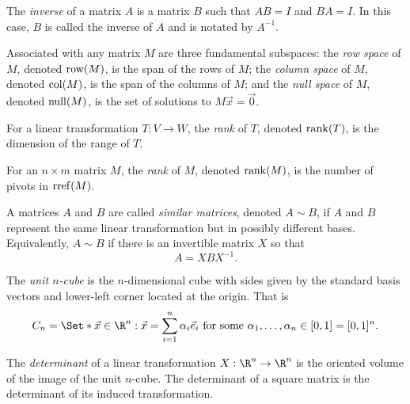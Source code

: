 \begin{SaveDefinition}[
	key=MatrixInverse,
	title={Matrix Inverse}]
		
	The \emph{inverse} of a matrix $A$ is a
		matrix $B$ such that $AB=I$ and $BA=I$.
		In this case, $B$ is called the inverse of $A$ and is notated by $A^{-1}$.
\end{SaveDefinition}

\begin{SaveDefinition}[key=FundamentalSubspaces, title={Fundamental Subspaces}]
	Associated with any matrix $M$ are three fundamental subspaces: the
	\emph{row space} of $M$, denoted $\operatorname{row}(M)$, is the span of the rows of
	$M$; the
	\emph{column space} of $M$, denoted $\operatorname{col}(M)$, is the span of the
	columns of $M$; and the
	\emph{null space} of $M$, denoted $\operatorname{null}(M)$, is the set of solutions to
	$M\vec x=\vec 0$.
\end{SaveDefinition}

\begin{SaveDefinition}[key=Rank, title={Rank}]
	For a linear transformation $T:V\to W$, the
	\emph{rank} of $T$, denoted $\operatorname{rank}(T)$, is the dimension of the range of
	$T$.

	For an $n\times m$ matrix $M$, the
	\emph{rank} of $M$, denoted $\operatorname{rank}(M)$, is the number of pivots in
	$\operatorname{rref}(M)$.
\end{SaveDefinition}

\begin{SaveDefinition}[key=SimilarMatrices, title={Similar Matrices}]
	A matrices $A$ and $B$ are called
	\emph{similar matrices}, denoted $A\sim B$, if $A$ and $B$ represent the
	same linear transformation but in possibly different bases. Equivalently,
	$A\sim B$ if there is an invertible matrix $X$ so that
	\[
		A=XBX^{-1}.
	\]

\end{SaveDefinition}

\begin{SaveDefinition}[key=Unitncube, title={Unit $n$-cube}]
	The
	\emph{unit $n$-cube} is the $n$-dimensional cube with sides given by the
	standard basis vectors and lower-left corner located at the origin. That
	is
	\[
		C_{n}=\Set*{\vec x\in\R^n:\vec x=\sum_{i=1}^n\alpha_i\vec e_i\text{
		for some }\alpha_1,\ldots,\alpha_n\in[0,1]}=[0,1]^{n}.
	\]

\end{SaveDefinition}

\begin{SaveDefinition}[key=Determinant, title={Determinant}]
	The
	\emph{determinant} of a linear transformation $X:\R^{n}\to \R^{n}$ is
	the oriented volume of the image of the unit $n$-cube. The determinant of
	a square matrix is the determinant of its induced transformation.
\end{SaveDefinition}

